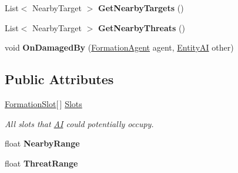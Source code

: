 \begin{DoxyCompactItemize}
\item 
\hypertarget{class_skyrates_1_1_a_i_1_1_formation_1_1_formation_owner_ac97695c48c5f56fbe39017b889326b50}{List$<$ Nearby\-Target $>$ {\bfseries Get\-Nearby\-Targets} ()}\label{class_skyrates_1_1_a_i_1_1_formation_1_1_formation_owner_ac97695c48c5f56fbe39017b889326b50}

\item 
\hypertarget{class_skyrates_1_1_a_i_1_1_formation_1_1_formation_owner_a79e5714cef6a98dc2cbbb5bcd837f475}{List$<$ Nearby\-Target $>$ {\bfseries Get\-Nearby\-Threats} ()}\label{class_skyrates_1_1_a_i_1_1_formation_1_1_formation_owner_a79e5714cef6a98dc2cbbb5bcd837f475}

\item 
\hypertarget{class_skyrates_1_1_a_i_1_1_formation_1_1_formation_owner_a8d9a35b95cc2963ba9741e5c93bc9670}{void {\bfseries On\-Damaged\-By} (\hyperlink{class_skyrates_1_1_a_i_1_1_formation_1_1_formation_agent}{Formation\-Agent} agent, \hyperlink{class_skyrates_1_1_entity_1_1_entity_a_i}{Entity\-A\-I} other)}\label{class_skyrates_1_1_a_i_1_1_formation_1_1_formation_owner_a8d9a35b95cc2963ba9741e5c93bc9670}

\end{DoxyCompactItemize}
\subsection*{Public Attributes}
\begin{DoxyCompactItemize}
\item 
\hyperlink{class_skyrates_1_1_a_i_1_1_formation_1_1_formation_slot}{Formation\-Slot}\mbox{[}$\,$\mbox{]} \hyperlink{class_skyrates_1_1_a_i_1_1_formation_1_1_formation_owner_a26e4434abb086b0999a702f1b8d27d98}{Slots}
\begin{DoxyCompactList}\small\item\em All slots that \hyperlink{namespace_skyrates_1_1_a_i}{A\-I} could potentially occupy. \end{DoxyCompactList}\item 
\hypertarget{class_skyrates_1_1_a_i_1_1_formation_1_1_formation_owner_aff55e138e2bc45bb42058558ac7637b6}{float {\bfseries Nearby\-Range}}\label{class_skyrates_1_1_a_i_1_1_formation_1_1_formation_owner_aff55e138e2bc45bb42058558ac7637b6}

\item 
\hypertarget{class_skyrates_1_1_a_i_1_1_formation_1_1_formation_owner_adf7176dd01dab732236a49e4e91ab5d5}{float {\bfseries Threat\-Range}}\label{class_skyrates_1_1_a_i_1_1_formation_1_1_formation_owner_adf7176dd01dab732236a49e4e91ab5d5}

\end{DoxyCompactItemize}


